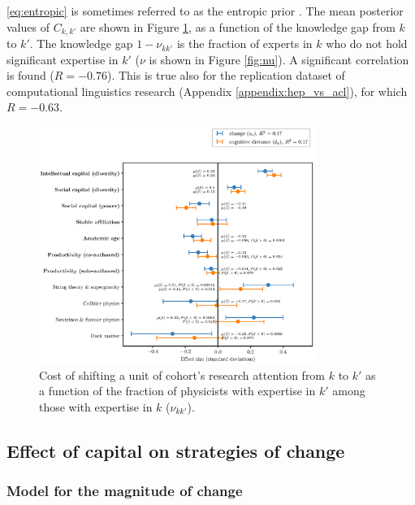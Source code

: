 \documentclass{article}
\begin{document}
\eqref{eq:entropic} is sometimes referred to as the entropic prior \citep{skilling1991bayesian,MacKay1995}. The mean posterior values of $C_{k,k'}$ are shown in Figure \ref{fig:cost_knowledge}, as a function of the knowledge gap from $k$ to $k'$. The knowledge gap  $1-\nu_{kk'}$ is the fraction of experts in $k$ who do not hold significant expertise in $k'$ ($\nu$ is shown in Figure \ref{fig:nu}).  A significant correlation is found ($R=-0.76$). This is true also for the replication dataset of computational linguistics research (Appendix \ref{appendix:hep_vs_acl}), for which $R=-0.63$.

\begin{figure}[H]
    \centering
    \includegraphics[width=0.8\textwidth]{Fig16}
    \caption{Cost of shifting a unit of cohort's research attention from $k$ to $k'$ as a function of the fraction of physicists with expertise in $k'$ among those with expertise in $k$ ($\nu_{kk'}$).}
    \label{fig:cost_knowledge}
\end{figure}



\subsection{Effect of capital on strategies of change}

\subsubsection{\label{appendix:change-model}Model for the magnitude of change}
\end{document}
